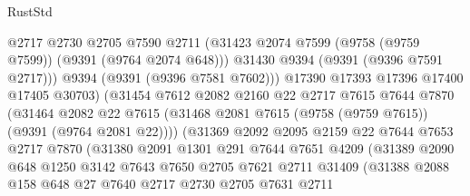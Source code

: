 \begin{lexlean}{RustStd}
\begin{coremodule}
                              @2717
                              @2730
                              @2705
                              @7590
                              @2711
                              (@31423 @2074 @7599 (@9758 (@9759 @7599)) (@9391 (@9764 @2074 @648)))
                              @31430
                              @9394
                              (@9391 (@9396 @7591 @2717)))
                            @9394
                            (@9391 (@9396 @7581 @7602)))
                          @17390
                          @17393
                          @17396
                          @17400
                          @17405
                          @30703)
                        (@31454
                          @7612
                          @2082
                          @2160
                          @22
                          @2717
                          @7615
                          @7644
                          @7870
                          (@31464
                            @2082
                            @22
                            @7615
                            (@31468 @2081 @7615 (@9758 (@9759 @7615)) (@9391 (@9764 @2081 @22))))
                          (@31369
                            @2092
                            @2095
                            @2159
                            @22
                            @7644
                            @7653
                            @2717
                            @7870
                            (@31380
                              @2091
                              @1301
                              @291
                              @7644
                              @7651
                              @4209
                              (@31389
                                @2090
                                @648
                                @1250
                                @3142
                                @7643
                                @7650
                                @2705
                                @7621
                                @2711
                                @31409
                                (@31388
                                  @2088
                                  @158
                                  @648
                                  @27
                                  @7640
                                  @2717
                                  @2730
                                  @2705
                                  @7631
                                  @2711

\end{coremodule}
\end{lexlean}
